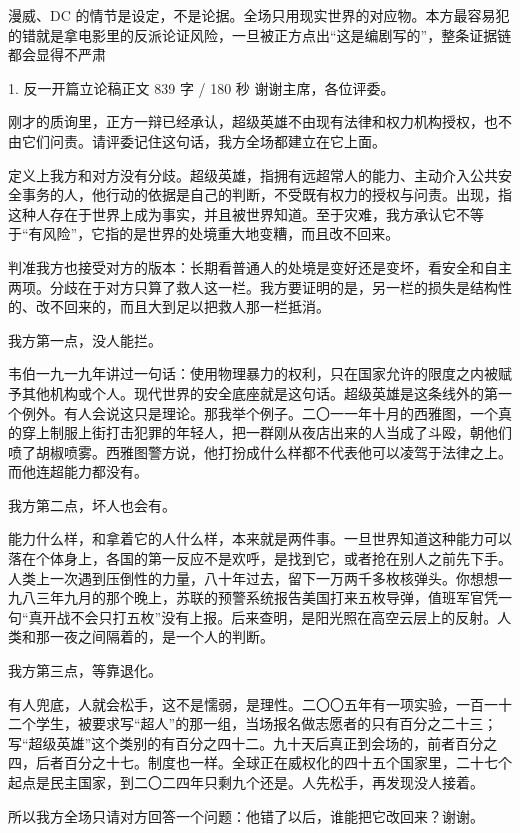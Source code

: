 \documentclass[script,con]{debate}
\begin{document}
\debatetitle
\begin{thesisbox}[证据纪律]漫威、DC 的情节是设定，不是论据。全场只用现实世界的对应物。本方最容易犯的错就是拿电影里的反派论证风险，一旦被正方点出“这是编剧写的”，整条证据链都会显得不严肃\end{thesisbox}
\begin{speech}{1. 反一开篇立论稿}{正文 839 字 / 180 秒}
谢谢主席，各位评委。

刚才的质询里，正方一辩已经承认，超级英雄不由现有法律和权力机构授权，也不由它们问责。请评委记住这句话，我方全场都建立在它上面。

定义上我方和对方没有分歧。超级英雄，指拥有远超常人的能力、主动介入公共安全事务的人，他行动的依据是自己的判断，不受既有权力的授权与问责。出现，指这种人存在于世界上成为事实，并且被世界知道。至于灾难，我方承认它不等于“有风险”，它指的是世界的处境重大地变糟，而且改不回来。

判准我方也接受对方的版本：长期看普通人的处境是变好还是变坏，看安全和自主两项。分歧在于对方只算了救人这一栏。我方要证明的是，另一栏的损失是结构性的、改不回来的，而且大到足以把救人那一栏抵消。

我方第一点，没人能拦。

韦伯一九一九年讲过一句话：使用物理暴力的权利，只在国家允许的限度之内被赋予其他机构或个人。现代世界的安全底座就是这句话。超级英雄是这条线外的第一个例外。有人会说这只是理论。那我举个例子。二〇一一年十月的西雅图，一个真的穿上制服上街打击犯罪的年轻人，把一群刚从夜店出来的人当成了斗殴，朝他们喷了胡椒喷雾。西雅图警方说，他打扮成什么样都不代表他可以凌驾于法律之上。而他连超能力都没有。

我方第二点，坏人也会有。

能力什么样，和拿着它的人什么样，本来就是两件事。一旦世界知道这种能力可以落在个体身上，各国的第一反应不是欢呼，是找到它，或者抢在别人之前先下手。人类上一次遇到压倒性的力量，八十年过去，留下一万两千多枚核弹头。你想想一九八三年九月的那个晚上，苏联的预警系统报告美国打来五枚导弹，值班军官凭一句“真开战不会只打五枚”没有上报。后来查明，是阳光照在高空云层上的反射。人类和那一夜之间隔着的，是一个人的判断。

我方第三点，等靠退化。

有人兜底，人就会松手，这不是懦弱，是理性。二〇〇五年有一项实验，一百一十二个学生，被要求写“超人”的那一组，当场报名做志愿者的只有百分之二十三；写“超级英雄”这个类别的有百分之四十二。九十天后真正到会场的，前者百分之四，后者百分之十七。制度也一样。全球正在威权化的四十五个国家里，二十七个起点是民主国家，到二〇二四年只剩九个还是。人先松手，再发现没人接着。

所以我方全场只请对方回答一个问题：他错了以后，谁能把它改回来？谢谢。

\begin{contingency}
\end{contingency}
\end{speech}
\end{document}
